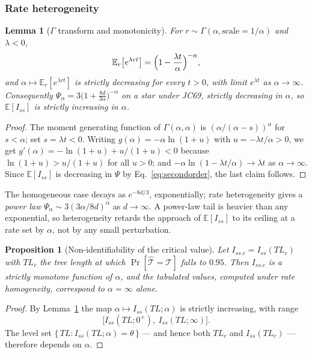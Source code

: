 \documentclass[preprint,12pt,authoryear]{elsarticle}
\newcommand{\Iss}{I_{ss}}
\newcommand{\Issc}{I_{ss.c}}
\newcommand{\E}{\mathbb{E}}
\newtheorem{lemma}[theorem]{Lemma}
\newtheorem{proposition}[theorem]{Proposition}
\theoremstyle{definition}
\theoremstyle{remark}
\begin{document}
\subsubsection*{Rate heterogeneity}

\begin{lemma}[$\Gamma$ transform and monotonicity]
\label{lem:gamma-monotone}
For $r\sim\Gamma(\alpha,\text{scale}=1/\alpha)$ and $\lambda<0$,
\begin{equation}
  \E_r\bigl[e^{\lambda rt}\bigr]=\Bigl(1-\frac{\lambda t}{\alpha}\Bigr)^{-\alpha},
\end{equation}
and $\alpha\mapsto\E_r[e^{\lambda rt}]$ is strictly decreasing for every
$t>0$, with limit $e^{\lambda t}$ as $\alpha\to\infty$. Consequently
$\Psi_\alpha=3\bigl(1+\frac{8d}{3\alpha}\bigr)^{-\alpha}$ on a star under
JC69, strictly decreasing in $\alpha$, so $\E[\Iss]$ is strictly increasing
in $\alpha$.
\end{lemma}

\begin{proof}
The moment generating function of $\Gamma(\alpha,\alpha)$ is
$(\alpha/(\alpha-s))^{\alpha}$ for $s<\alpha$; set $s=\lambda t<0$. Writing
$g(\alpha)=-\alpha\ln(1+u)$ with $u=-\lambda t/\alpha>0$, we get
$g'(\alpha)=-\ln(1+u)+u/(1+u)<0$ because $\ln(1+u)>u/(1+u)$ for all $u>0$;
and $-\alpha\ln(1-\lambda t/\alpha)\to\lambda t$ as $\alpha\to\infty$. Since
$\E[\Iss]$ is decreasing in $\Psi$ by Eq.~\eqref{eq:secondorder}, the last
claim follows.
\end{proof}

The homogeneous case decays as $e^{-8d/3}$, exponentially; rate heterogeneity
gives a \emph{power law} $\Psi_\alpha\sim3(3\alpha/8d)^{\alpha}$ as
$d\to\infty$. A power-law tail is heavier than any exponential, so
heterogeneity retards the approach of $\E[\Iss]$ to its ceiling at a rate set
by $\alpha$, not by any small perturbation.

\begin{proposition}[Non-identifiability of the critical value]
\label{prop:nonident}
Let $\Issc=\Iss(TL_c)$ with $TL_c$ the tree length at which
$\Pr[\hat{\mathcal T}=\mathcal T]$ falls to $0.95$. Then $\Issc$ is a strictly
monotone function of $\alpha$, and the tabulated values, computed under rate
homogeneity, correspond to $\alpha=\infty$ alone.
\end{proposition}

\begin{proof}
By Lemma~\ref{lem:gamma-monotone} the map $\alpha\mapsto\Iss(TL;\alpha)$ is
strictly increasing, with range
\[
  \bigl[\Iss(TL;0^+),\ \Iss(TL;\infty)\bigr].
\]
The level set $\{\,TL:\Iss(TL;\alpha)=\theta\,\}$ --- and hence both $TL_c$
and $\Iss(TL_c)$ --- therefore depends on $\alpha$.
\end{proof}
\end{document}
